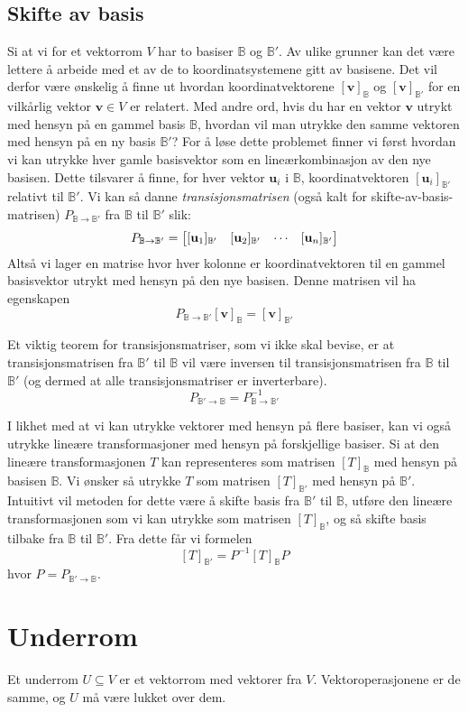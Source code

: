 \documentclass[12pt,a4paper,norsk]{article}
\makeatletter
\newcommand{\B}{\mathbb{B}}
\newcommand{\mat}[2]{\left[\begin{array}{@{}#1@{}}#2\end{array}\right]}
\newcommand{\vv}{\textbf{v}}
\newcommand{\vu}{\textbf{u}}
\makeatother
\begin{document}
\subsection{Skifte av basis}
Si at vi for et vektorrom $V$ har to basiser $\B$ og $\B'$. Av ulike grunner kan
det være lettere å arbeide med et av de to koordinatsystemene gitt av basisene.
Det vil derfor være ønskelig å finne ut hvordan koordinatvektorene $[\vv]_\B$ og
$[\vv]_{\B'}$ for en vilkårlig vektor $\vv \in V$ er relatert. 
Med andre ord, hvis du har en vektor $\vv$ utrykt med hensyn på en gammel basis $\B$,
hvordan vil man utrykke den samme vektoren med hensyn på en ny basis $\B'$? 
For å løse dette problemet finner vi først hvordan vi kan utrykke hver gamle
basisvektor som en lineærkombinasjon av den nye basisen. Dette tilsvarer å
finne, for hver vektor $\vu_i$ i $\B$, koordinatvektoren $[\vu_i]_{\B'}$
relativt til $\B'$. Vi kan så danne \textit{transisjonsmatrisen} (også kalt for
skifte-av-basis-matrisen)  $P_{\B\rightarrow\B'}$ fra $\B$ til $\B'$ slik: 
\[P_{\B\rightarrow\B'} = \mat{cccc}{[\vu_1]_{\B'} & [\vu_2]_{\B'} & \cdots & [\vu_n]_{\B'}}\]
Altså vi lager en matrise hvor hver kolonne er koordinatvektoren til en gammel
basisvektor utrykt med hensyn på den nye basisen. Denne matrisen vil ha egenskapen 
\[P_{\B\rightarrow\B'}[\vv]_\B = [\vv]_{\B'}\]

Et viktig teorem for transisjonsmatriser, som vi ikke skal bevise, er at
transisjonsmatrisen fra $\B'$ til $\B$ vil være inversen til transisjonsmatrisen
fra $\B$ til $\B'$ (og dermed at alle transisjonsmatriser er inverterbare). 
\[P_{\B'\rightarrow\B} = P_{\B\rightarrow\B'}^{-1}\]

I likhet med at vi kan utrykke vektorer med hensyn på flere basiser, kan vi også utrykke
lineære transformasjoner med hensyn på forskjellige basiser. Si at den lineære
transformasjonen $T$ kan representeres som matrisen $[T]_\B$ med hensyn på
basisen $\B$. Vi ønsker så utrykke $T$ som matrisen $[T]_{\B'}$ med hensyn på
$\B'$. Intuitivt vil metoden for dette være å skifte basis fra $\B'$ til $\B$, utføre den lineære transformasjonen som vi kan utrykke som matrisen $[T]_\B$,
og så skifte basis tilbake fra $\B$ til $\B'$. Fra dette får vi formelen 
\[[T]_{\B'}=P^{-1}[T]_\B P\]
hvor $P=P_{\B'\rightarrow\B}$.

\section{Underrom}
Et underrom $U \subseteq V$ er et vektorrom med vektorer fra $V$.
Vektoroperasjonene er de samme, og $U$ må være lukket over dem.
\end{document}

